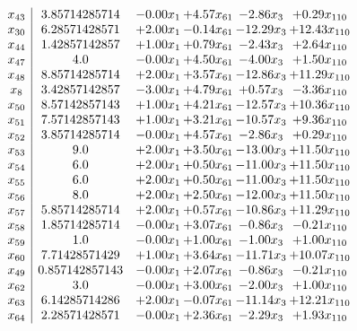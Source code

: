 \documentclass[8pt]{article}
\begin{document}
\[\begin{array}{c| c c@{\hskip 2pt} c@{\hskip 2pt} c@{\hskip 2pt} c@{\hskip 2pt} }
 x_{43}   &  3.85714285714 & -0.00 x_{1} & +  4.57 x_{61} & -2.86 x_{3} & +  0.29 x_{110}\\
 x_{30}   &  6.28571428571 & +  2.00 x_{1} & -0.14 x_{61} & -12.29 x_{3} & + 12.43 x_{110}\\
 x_{44}   &  1.42857142857 & +  1.00 x_{1} & +  0.79 x_{61} & -2.43 x_{3} & +  2.64 x_{110}\\
 x_{47}   &  4.0 & -0.00 x_{1} & +  4.50 x_{61} & -4.00 x_{3} & +  1.50 x_{110}\\
 x_{48}   &  8.85714285714 & +  2.00 x_{1} & +  3.57 x_{61} & -12.86 x_{3} & + 11.29 x_{110}\\
 x_{8}   &  3.42857142857 & -3.00 x_{1} & +  4.79 x_{61} & +  0.57 x_{3} & -3.36 x_{110}\\
 x_{50}   &  8.57142857143 & +  1.00 x_{1} & +  4.21 x_{61} & -12.57 x_{3} & + 10.36 x_{110}\\
 x_{51}   &  7.57142857143 & +  1.00 x_{1} & +  3.21 x_{61} & -10.57 x_{3} & +  9.36 x_{110}\\
 x_{52}   &  3.85714285714 & -0.00 x_{1} & +  4.57 x_{61} & -2.86 x_{3} & +  0.29 x_{110}\\
 x_{53}   &  9.0 & +  2.00 x_{1} & +  3.50 x_{61} & -13.00 x_{3} & + 11.50 x_{110}\\
 x_{54}   &  6.0 & +  2.00 x_{1} & +  0.50 x_{61} & -11.00 x_{3} & + 11.50 x_{110}\\
 x_{55}   &  6.0 & +  2.00 x_{1} & +  0.50 x_{61} & -11.00 x_{3} & + 11.50 x_{110}\\
 x_{56}   &  8.0 & +  2.00 x_{1} & +  2.50 x_{61} & -12.00 x_{3} & + 11.50 x_{110}\\
 x_{57}   &  5.85714285714 & +  2.00 x_{1} & +  0.57 x_{61} & -10.86 x_{3} & + 11.29 x_{110}\\
 x_{58}   &  1.85714285714 & -0.00 x_{1} & +  3.07 x_{61} & -0.86 x_{3} & -0.21 x_{110}\\
 x_{59}   &  1.0 & -0.00 x_{1} & +  1.00 x_{61} & -1.00 x_{3} & +  1.00 x_{110}\\
 x_{60}   &  7.71428571429 & +  1.00 x_{1} & +  3.64 x_{61} & -11.71 x_{3} & + 10.07 x_{110}\\
 x_{49}   &  0.857142857143 & -0.00 x_{1} & +  2.07 x_{61} & -0.86 x_{3} & -0.21 x_{110}\\
 x_{62}   &  3.0 & -0.00 x_{1} & +  3.00 x_{61} & -2.00 x_{3} & +  1.00 x_{110}\\
 x_{63}   &  6.14285714286 & +  2.00 x_{1} & -0.07 x_{61} & -11.14 x_{3} & + 12.21 x_{110}\\
 x_{64}   &  2.28571428571 & -0.00 x_{1} & +  2.36 x_{61} & -2.29 x_{3} & +  1.93 x_{110}\\

\end{array}\]
\end{document}
